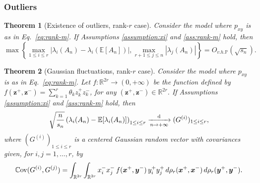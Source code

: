 \documentclass[11pt,oneside]{amsart}
\theoremstyle{plain}
\newtheorem{theorem}{Theorem}[section]
\numberwithin{equation}{section}
\newcommand{\R}{\mathbb{R}}
\newcommand{\E}{\mathbb{E}}
\newcommand{\cov}{\mathbb{C}\hspace{-0.pt}{\rm ov}}
\newcommand{\p}{\mathbb{P}}
\newcommand{\dconv}{\xrightarrow[\textit{n} \to +\infty]{\quad {\rm d} \quad}}
\newcommand{\scaling}{s_n}
\newcommand{\Ohp}{O_{v.h.\p}}
\begin{document}
\subsubsection{Outliers}
\begin{theorem}[Existence of outliers, rank-$r$ case] \label{thm:LLN-A-rank-m}
Consider the model where $p_{xy}$ is as in Eq.\ \eqref{eq:rank-m}.
If Assumptions \ref{assumption:xi} and \ref{ass:rank-m} hold, then
\begin{equation}
    \max\left\{\max_{ 1 \le i\le r}\left|\lambda_i(A_n)- \lambda_i(\E[A_n]) \right|,\max_{ r+1 \le j\le n}|\lambda_j(A_n)|\right\}=\Ohp(\sqrt{\scaling}).
\end{equation}
\end{theorem}

\begin{theorem}[Gaussian fluctuations, rank-$r$ case] \label{thm:CLT-A-rank-m}
Consider the model where $p_{xy}$ is as in Eq.\ \eqref{eq:rank-m}.
Let $f:\R^{2r}\to (0,+\infty)$ be the function defined by $f(\boldsymbol{z}^+,\boldsymbol{z}^-)=  \sum_{k=1}^r \theta_k z_k^+ z_k^-$, for any $(\boldsymbol{z}^+,\boldsymbol{z}^-) \in \R^{2r}$.
If Assumptions \ref{assumption:xi} and \ref{ass:rank-m} hold, then
\begin{equation}
    \sqrt{\frac{n}{\scaling}}\left(\lambda_i(A_n)- \E[\lambda_i(A_n)] \right)_{1\le i \le r}\dconv (G^{(i)})_{1\le i \le r},
\end{equation}
where $(G^{(i)})_{1\le i \le r}$ is a centered Gaussian random vector with covariances given, for $i,j=1,\dots,r$, by
 \begin{equation} \label{eq:cov}
        \cov (G^{(i)},G^{(j)})=
        \displaystyle 
        \int_{\R^{2r}}\int_{\R^{2r}}
        x^-_i x_j^-\,  f(\boldsymbol{x}^+,\boldsymbol{y}^-) \, y_i^+y^+_j
        \,d\rho_r(\boldsymbol{x}^+,\boldsymbol{x}^-)
        \,d\rho_r(\boldsymbol{ y}^+,\boldsymbol{y}^-).
    \end{equation}
\end{theorem}
\end{document}

